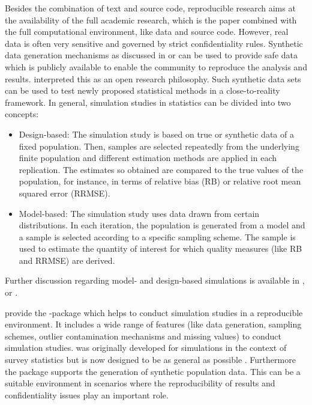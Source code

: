 \documentclass[article]{ajs}
\begin{document}
Besides the combination of text and source code, reproducible research aims at the availability of the full academic research, which is the paper combined with the full computational environment, like data and source code. However, real data is often very sensitive and governed by strict confidentiality rules. Synthetic data generation mechanisms as discussed in \cite{alfons2011} or \cite{Kol11} can be used to provide safe data which is publicly available to enable the community to reproduce the analysis and results. \cite{Bur14} interpreted this as an open research philosophy. Such synthetic data sets can be used to test newly proposed statistical methods in a close-to-reality framework. 
In general, simulation studies in statistics can be divided into two concepts:
%
\begin{itemize}
\item Design-based: The simulation study is based on true or synthetic data of a fixed population. Then, samples are selected repeatedly from the underlying finite population and different estimation methods are applied in each replication. The estimates so obtained are compared to the true values of the population, for instance, in terms of relative bias (RB) or relative root mean squared error (RRMSE).
\item Model-based: The simulation study uses data drawn from certain distributions. In each iteration, the population is generated from a model and a sample is selected according to a specific sampling scheme. The sample is used to estimate the quantity of interest for which quality measures (like RB and RRMSE) are derived.  
\end{itemize}
Further discussion regarding model- and design-based simulations is available in \cite{Mue03}, \cite{Sal10} or \cite{Alf10}.

\cite{Alf10} provide the -package  which helps to conduct simulation studies in a reproducible environment. It includes a wide range of features (like data generation, sampling schemes, outlier contamination mechanisms and missing values) to conduct simulation studies.  was originally developed for simulations in the context of survey statistics but is now designed to be as general as possible \citep[cf.][]{Alf10}. Furthermore the package  \citep{Alf14} supports the generation of synthetic population data. This can be a suitable environment in scenarios where the reproducibility of results and confidentiality issues play an important role.
\end{document}
